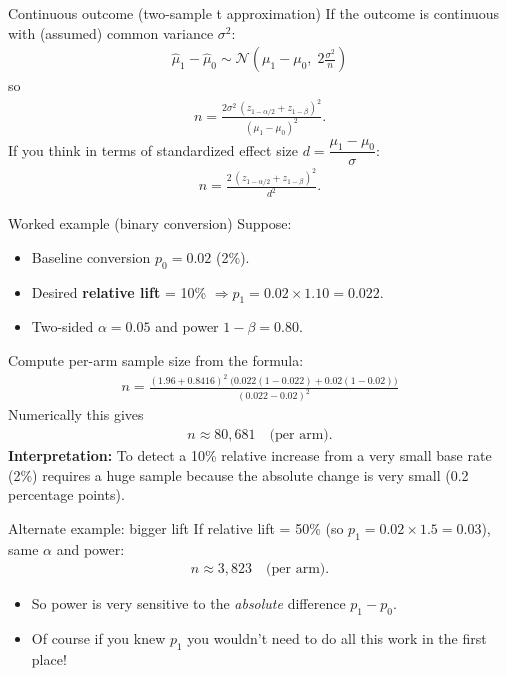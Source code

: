 \documentclass[aspectratio=169,11pt]{beamer}
\begin{document}
\begin{frame}{Continuous outcome (two-sample t approximation)}
  If the outcome is continuous with (assumed) common variance $\sigma^2$:
  \begin{align*}
    \hat{\mu}_1 - \hat{\mu}_0 \sim \mathcal{N}\!\left(\mu_1-\mu_0,\; 2\frac{\sigma^2}{n}\right)
  \end{align*}
  so
  \begin{align*}
    n = \frac{2\sigma^2\,(z_{1-\alpha/2}+z_{1-\beta})^2}{(\mu_1-\mu_0)^2}.
  \end{align*}
  If you think in terms of standardized effect size $d = \dfrac{\mu_1-\mu_0}{\sigma}$:
  \begin{align*}
    n = \frac{2\,(z_{1-\alpha/2}+z_{1-\beta})^2}{d^2}.
  \end{align*}
\end{frame}

\begin{frame}{Worked example (binary conversion)}
  Suppose:
  \begin{itemize}
    \item Baseline conversion $p_0 = 0.02$ (2\%).
    \item Desired \textbf{relative lift} = 10\% $\Rightarrow p_1 = 0.02 \times 1.10 = 0.022$.
    \item Two-sided $\alpha = 0.05$ and power $1-\beta = 0.80$.
  \end{itemize}

  Compute per-arm sample size from the formula:
  \begin{align*}
  n = \frac{(1.96 + 0.8416)^2\;\big(0.022(1-0.022)+0.02(1-0.02)\big)}{(0.022-0.02)^2}
  \end{align*}
  Numerically this gives
  \begin{align*}
    n \approx 80{,}681 \quad\text{(per arm)}.
  \end{align*}
  \vspace{4pt}
  \textbf{Interpretation:} To detect a 10\% relative increase from a very small base rate (2\%) requires a huge sample because the absolute change is very small (0.2 percentage points).
\end{frame}


\begin{frame}{Alternate example: bigger lift}
  If relative lift = 50\% (so $p_1 = 0.02 \times 1.5 = 0.03$), same $\alpha$ and power:
  \begin{align*}
    n \approx 3{,}823 \quad\text{(per arm)}.
  \end{align*}

\begin{itemize}
  \item So power is very sensitive to the \emph{absolute} difference $p_1-p_0$.
  \item Of course if you knew $p_1$ you wouldn't need to do all this work in the first place!
\end{itemize}
\end{frame}
\end{document}

